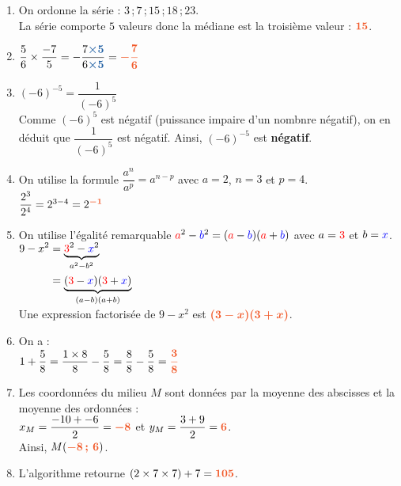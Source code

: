 \documentclass[a4paper,11pt]{article}
\begin{document}
\begin{seance}{}
\begin{enumerate}
	\item On ordonne la série :  $3$\,;\,$7$\,;\,$15$\,;\,$18$\,;\,$23$.\\
      La série comporte $5$ valeurs donc la médiane est la troisième valeur : ${\color[HTML]{f15929}\boldsymbol{15}}$.
	\item $\dfrac{5}{6}\times \dfrac{-7}{5}=-\dfrac{7{\color[HTML]{2563a5}\boldsymbol{\times5}} }{6{\color[HTML]{2563a5}\boldsymbol{\times5}}}={\color[HTML]{f15929}\boldsymbol{-\dfrac{7}{6}}}$
	\item $(-6)^{-5}=\dfrac{1}{(-6)^{5}}$\\
     Comme  $(-6)^{5}$ est  négatif (puissance impaire d'un nombnre négatif), on en déduit que  $\dfrac{1}{(-6)^{5}}$ est négatif.
    Ainsi, $(-6)^{-5}$ est {\bfseries \color[HTML]{f15929}négatif}.
	\item On utilise la formule $\dfrac{a^n}{a^p}=a^{n - p}$
        avec $a=2$,  $n=3$ et $p=4$.\\
        $\dfrac{2^{3}}{2^{4}}=2^{3-4}=2^{{\color[HTML]{f15929}\boldsymbol{-1}}}$
	\item On utilise l'égalité remarquable ${\color{red} a}^2-{\color{blue} b}^2=({\color{red} a}-{\color{blue} b})({\color{red} a}+{\color{blue} b})$ avec $a={\color{red} 3}$ et $b={\color{blue} x}$.\\$\begin{aligned}
  9-x^2&=\underbrace{{\color{red} 3}^2-{\color{blue} x}^2}_{a^2-b^2}\\
  &=\underbrace{({\color{red} 3}-{\color{blue} x})({\color{red} 3}+{\color{blue} x})}_{(a-b)(a+b)}
  \end{aligned}$ \\
    Une expression factorisée de $9-x^2$ est ${\color[HTML]{f15929}\boldsymbol{(3-x)(3+x)}}$.
	\item On a : \\$
      1+\dfrac{5}{8} = \dfrac{1 \times 8}{8} - \dfrac{5}{8} 
      = \dfrac{8}{8} - \dfrac{5}{8}
        ={\color[HTML]{f15929}\boldsymbol{\dfrac{3}{8}}}$
	\item Les coordonnées du milieu $M$ sont données par la moyenne des abscisses et la moyenne des ordonnées : \\
      $x_M=\dfrac{-10+-6}{2}={\color[HTML]{f15929}\boldsymbol{-8}}$ et $y_M=\dfrac{3+9}{2}={\color[HTML]{f15929}\boldsymbol{6}}$.\\
      Ainsi,  $M({\color[HTML]{f15929}\boldsymbol{-8\,;\,6}})$.
	\item  L'algorithme retourne $(2\times7\times7)+7={\color[HTML]{f15929}\boldsymbol{105}}$. 

\end{enumerate}
\end{seance}
\end{document}
